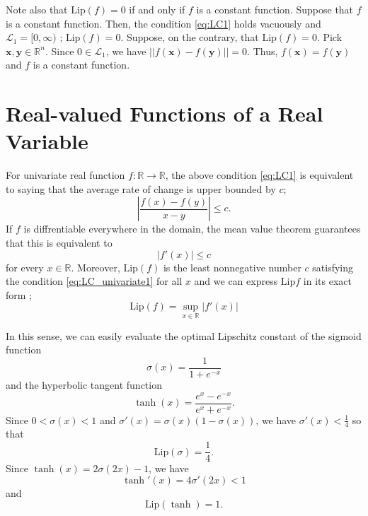 \documentclass[12pt]{report}
\numberwithin{figure}{chapter}
\theoremstyle{plain}
\theoremstyle{definition}
\theoremstyle{corollary}
\theoremstyle{definition}
\theoremstyle{plain}
\theoremstyle{definition}
\theoremstyle{plain}
\newcommand\bx{\ensuremath{\boldsymbol x}}
\newcommand\by{\ensuremath{\boldsymbol y}}
\newcommand\lip{\ensuremath{\text{Lip}}}
\begin{document}
Note also that \(\lip(f)=0\) if and only if \(f\) is a constant function.
Suppose that \(f\) is a constant function.
Then, the condition \eqref{eq:LC1} holds vacuously and \(\mathcal L_1=[0,\infty)\) ; \(\lip(f)=0\).
Suppose, on the contrary, that \(\lip(f)=0\).
Pick \(\bx,\by\in\mathbb R^n\).
Since \(0\in\mathcal L_1\), we have \(||f(\bx)-f(\by)||=0\).
Thus, \(f(\bx)=f(\by)\) and \(f\) is a constant function.

\section{Real-valued Functions of a Real Variable}

For univariate real function \(f:\mathbb R\to\mathbb R\), the above condition \eqref{eq:LC1} is equivalent to saying that the average rate of change is upper bounded by \(c\);
\begin{equation}\label{eq:LC_average_rate_of_change}
\left|\frac{f(x)-f(y)}{x-y}\right|\le c.
\end{equation}
If \(f\) is diffrentiable everywhere in the domain, the mean value theorem guarantees that this is equivalent to 
\begin{equation}\label{eq:LC_univariate1}
|f'(x)|\le c
\end{equation}
for every \(x\in\mathbb R\).
Moreover, \(\lip(f)\) is the least nonnegative number \(c\) satisfying the condition \eqref{eq:LC_univariate1} for all \(x\) and we can express \(\lip f\) in its exact form ; 
\begin{equation}\label{eq:LC_univariate2}
\lip (f) = \sup_{x\in\mathbb R}|f'(x)|
\end{equation}

In this sense, we can easily evaluate the optimal Lipschitz constant of the sigmoid function
\begin{equation}\label{eq:sigmoid}
\sigma(x)=\frac1{1+e^{-x}}
\end{equation}
and the hyperbolic tangent function
\begin{equation}\label{eq:tanh}
\tanh(x)=\frac{e^x-e^{-x}}{e^x+e^{-x}}.
\end{equation}
Since \(0<\sigma(x)<1\) and \(\sigma'(x)=\sigma(x)\left(1-\sigma(x)\right)\), we have \(\sigma'(x)<\frac14\) so that
\begin{equation}\label{eq:sigmoid_LC}
\lip(\sigma)=\frac14.
\end{equation}
Since \(\tanh(x)=2\sigma(2x)-1\), we have
\[\tanh'(x)=4\sigma'(2x)<1\]
and
\begin{equation}\label{eq:tanh_LC}
\lip(\tanh)=1.
\end{equation}
\end{document}

